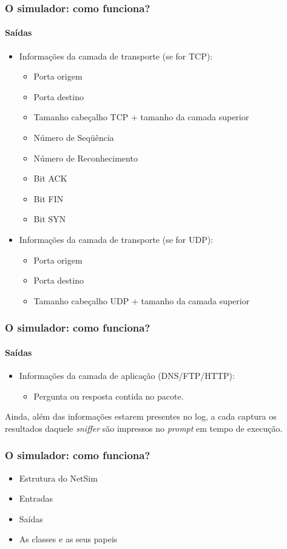 \documentclass{beamer}
\begin{document}
\begin{frame}
	\frametitle{O simulador: como funciona?}
	\framesubtitle{Saídas}
	\begin{itemize}
		\item Informações da camada de transporte (se for TCP):
		\begin{itemize}
			\item Porta origem
			\item Porta destino
			\item Tamanho cabeçalho TCP + tamanho da camada superior
			\item Número de Seqüência
			\item Número de Reconhecimento
			\item Bit ACK
			\item Bit FIN
			\item Bit SYN
		\end{itemize}
		\item Informações da camada de transporte (se for UDP):
		\begin{itemize}
			\item Porta origem
			\item Porta destino
			\item Tamanho cabeçalho UDP + tamanho da camada superior
		\end{itemize}
	\end{itemize}
\end{frame}

\begin{frame}
	\frametitle{O simulador: como funciona?}
	\framesubtitle{Saídas}
	\begin{itemize}
		\item Informações da camada de aplicação (DNS/FTP/HTTP):
		\begin{itemize}
			\item Pergunta ou resposta contida no pacote.
		\end{itemize}
	\end{itemize}
	Ainda, além das informações estarem presentes no log, a cada captura os resultados daquele \textit{sniffer}
	são impressos no \textit{prompt} em tempo de execução.
\end{frame}

\begin{frame}
	\frametitle{O simulador: como funciona?}
	\begin{itemize}
		\item \textcolor{covered}{Estrutura do NetSim}
		\item \textcolor{covered}{Entradas}
		\item \textcolor{covered}{Saídas}
		\item As classes e as seus papeis
	\end{itemize}
\end{frame}
\end{document}
